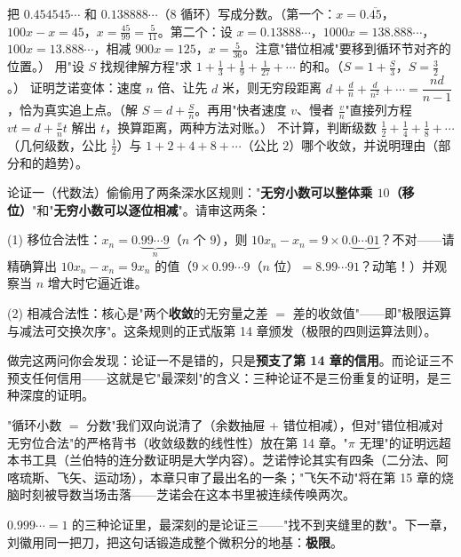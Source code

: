 \begin{dongshou}
\begin{itemize}
  \yisi 把 $0.454545\cdots$ 和 $0.138888\cdots$（$8$ 循环）写成分数。（第一个：$x = 0.\overline{45}$，$100x - x = 45$，$x = \tfrac{45}{99} = \tfrac{5}{11}$。第二个：设 $x = 0.13888\cdots$，$1000x = 138.888\cdots$，$100x = 13.888\cdots$，相减 $900x = 125$，$x = \tfrac{5}{36}$。注意"错位相减"要移到循环节对齐的位置。）
  \yier 用"设 $S$ 找规律解方程"求 $1 + \tfrac13 + \tfrac19 + \tfrac1{27} + \cdots$ 的和。（$S = 1 + \tfrac S3$，$S = \tfrac32$。）
  \yier 证明芝诺变体：速度 $n$ 倍、让先 $d$ 米，则无穷段距离 $d + \tfrac dn + \tfrac d{n^2} + \cdots = \dfrac{nd}{n-1}$，恰为真实追上点。（解 $S = d + \tfrac Sn$。再用"快者速度 $v$、慢者 $\tfrac vn$"直接列方程 $vt = d + \tfrac vn t$ 解出 $t$，换算距离，两种方法对账。）
  \yisi 不计算，判断级数 $\tfrac12 + \tfrac14 + \tfrac18 + \cdots$（几何级数，公比 $\tfrac12$）与 $1 + 2 + 4 + 8 + \cdots$（公比 $2$）哪个收敛，并说明理由（部分和的趋势）。
\end{itemize}
\end{dongshou}

\begin{shaonao}
论证一（代数法）偷偷用了两条深水区规则："\textbf{无穷小数可以整体乘 $10$（移位）}"和"\textbf{无穷小数可以逐位相减}"。请审这两条：

(1) 移位合法性：$x_n = 0.\underbrace{99\cdots9}_{n}$（$n$ 个 $9$），则 $10 x_n - x_n = 9\times 0.\underbrace{0\cdots01}_{}$？不对——请精确算出 $10x_n - x_n = 9x_n$ 的值（$9 \times 0.99\cdots9$（$n$ 位）$= 8.99\cdots91$？动笔！）并观察当 $n$ 增大时它逼近谁。

(2) 相减合法性：核心是"两个\textbf{收敛}的无穷量之差 $=$ 差的收敛值"——即"极限运算与减法可交换次序"。这条规则的正式版第 14 章颁发（极限的四则运算法则）。

做完这两问你会发现：论证一不是错的，只是\textbf{预支了第 14 章的信用}。而论证三不预支任何信用——这就是它"最深刻"的含义：三种论证不是三份重复的证明，是三种深度的证明。
\end{shaonao}

\begin{chengshi}
"循环小数 $=$ 分数"我们双向说清了（余数抽屉 + 错位相减），但对"错位相减对无穷位合法"的严格背书（收敛级数的线性性）放在第 14 章。"$\pi$ 无理"的证明远超本书工具（兰伯特的连分数证明是大学内容）。芝诺悖论其实有四条（二分法、阿喀琉斯、飞矢、运动场），本章只审了最出名的一条；"飞矢不动"将在第 15 章的烧脑时刻被导数当场击落——芝诺会在这本书里被连续传唤两次。
\end{chengshi}

$0.999\cdots = 1$ 的三种论证里，最深刻的是论证三——"找不到夹缝里的数"。下一章，刘徽用同一把刀，把这句话锻造成整个微积分的地基：\textbf{极限}。
